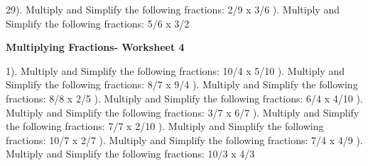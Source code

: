 \documentclass{article}%
\begin{document}
29). Multiply and Simplify the following fractions: 2/9 x 3/6%
\newline%
\newline%
). Multiply and Simplify the following fractions: 5/6 x 3/2%
\newline%
\newline%
\newline%
\pagebreak%
\large%
\begin{center}%
\textbf{Multiplying Fractions- Worksheet 4}%
\newline%
\newline%
\newline%
\end{center} \normalsize%
1). Multiply and Simplify the following fractions: 10/4 x 5/10%
\newline%
\newline%
). Multiply and Simplify the following fractions: 8/7 x 9/4%
\newline%
\newline%
). Multiply and Simplify the following fractions: 8/8 x 2/5%
\newline%
\newline%
). Multiply and Simplify the following fractions: 6/4 x 4/10%
\newline%
\newline%
). Multiply and Simplify the following fractions: 3/7 x 6/7%
\newline%
\newline%
). Multiply and Simplify the following fractions: 7/7 x 2/10%
\newline%
\newline%
). Multiply and Simplify the following fractions: 10/7 x 2/7%
\newline%
\newline%
). Multiply and Simplify the following fractions: 7/4 x 4/9%
\newline%
\newline%
). Multiply and Simplify the following fractions: 10/3 x 4/3%
\newline%
\newline%
\end{document}
